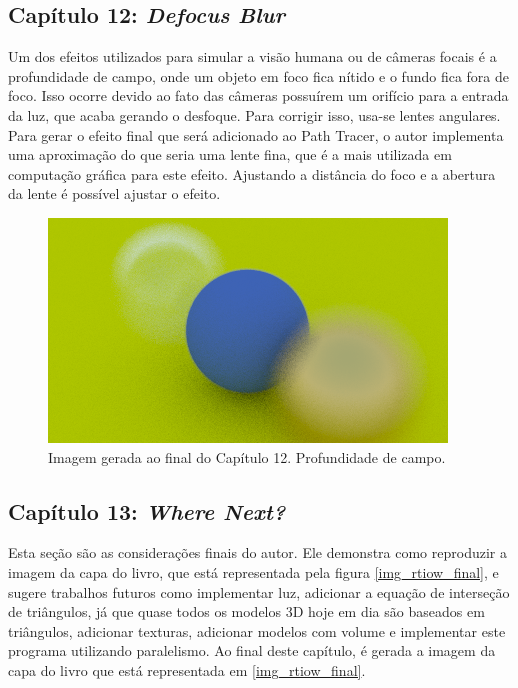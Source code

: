 \documentclass[journal]{IEEEtran}
\begin{document}
\subsection*{Capítulo 12: \emph{Defocus Blur}}
Um dos efeitos utilizados para simular a visão humana ou de câmeras focais é a profundidade de campo, onde
um objeto em foco fica nítido e o fundo fica fora de foco. Isso ocorre devido ao fato das câmeras possuírem
um orifício para a entrada da luz, que acaba gerando o desfoque. Para corrigir isso, usa-se lentes angulares.
Para gerar o efeito final que será adicionado ao Path Tracer, o autor implementa uma aproximação do que seria
uma lente fina, que é a mais utilizada em computação gráfica para este efeito. Ajustando a distância do foco
e a abertura da lente é possível ajustar o efeito.

\begin{figure}[ht]
  \centering
  \includegraphics[width=\linewidth]{media/img-1.20-depth-of-field.png}
  \caption{Imagem gerada ao final do Capítulo 12. Profundidade de campo.}
  \label{img_dof}
\end{figure}

\subsection*{Capítulo 13: \emph{Where Next?}}
Esta seção são as considerações finais do autor. Ele demonstra como reproduzir a imagem da capa do livro, que
está representada pela figura \ref{img_rtiow_final}, e sugere trabalhos futuros como implementar luz, adicionar
a equação de interseção de triângulos, já que quase todos os modelos 3D hoje em dia são baseados em triângulos,
adicionar texturas, adicionar modelos com volume e implementar este programa utilizando paralelismo.
Ao final deste capítulo, é gerada a imagem da capa do livro que está representada em \ref{img_rtiow_final}.
\end{document}
